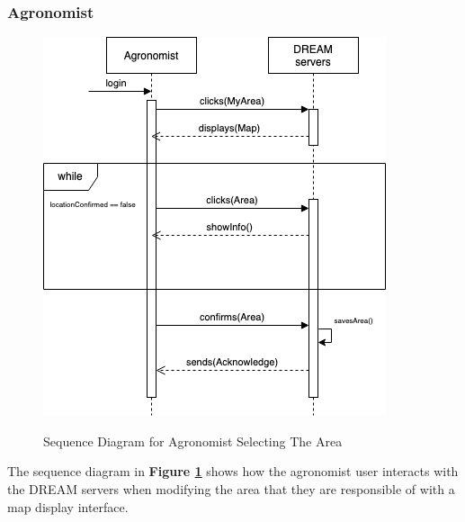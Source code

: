 \newpage
\subsubsection{Agronomist}

\begin{figure}[hpt!]
\centering
\includegraphics[scale=0.6]{Files/sequence_disgrams/thePNGs/agronomist_choosingLocation.png}\\
\caption{\label{fig:agrSeqArea}Sequence Diagram for Agronomist Selecting The Area}
\end{figure}

\begin{flushleft}
The sequence diagram in \textbf{Figure \ref{fig:agrSeqArea}} shows how the agronomist user interacts with the DREAM servers when modifying the area that they are responsible of with a map display interface.
\end{flushleft}


